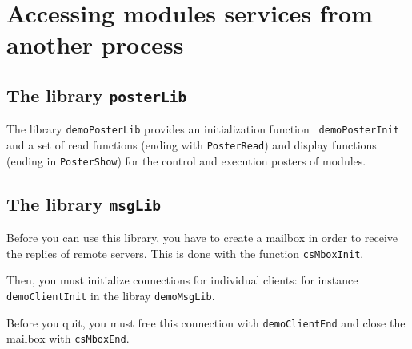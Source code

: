 \section{Accessing modules services from another process}

\subsection{The library {\tt posterLib}}

The library {\tt  demoPosterLib} provides an initialization function {\tt
demoPosterInit} and a set of  read functions (ending with {\tt PosterRead})
and display  functions (ending in {\tt  PosterShow}) for the  control and
execution posters of modules.

\subsection{The library {\tt msgLib}}

Before you can use this library, you have to create a mailbox in order to
receive the replies  of remote servers. This is   done with the  function
{\tt csMboxInit}.

Then, you  must  initialize   connections  for individual    clients: for
instance {\tt demoClientInit} in the libray {\tt demoMsgLib}.

Before you  quit, you must  free this connection with {\tt demoClientEnd}
and close the mailbox with {\tt csMboxEnd}.
